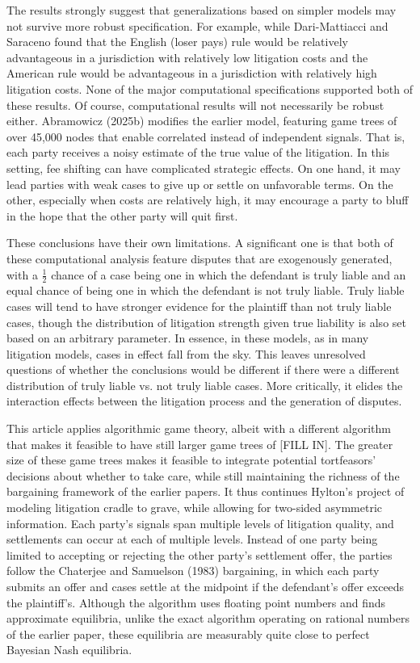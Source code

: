 \documentclass{article}
\begin{document}
The results strongly suggest that generalizations based on simpler models may not survive more robust specification. For example, while Dari-Mattiacci and Saraceno found that the English (loser pays) rule would be relatively advantageous in a jurisdiction with relatively low litigation costs and the American rule would be advantageous in a jurisdiction with relatively high litigation costs. None of the major computational specifications supported both of these results. Of course, computational results will not necessarily be robust either. Abramowicz (2025b) modifies the earlier model, featuring game trees of over 45,000 nodes that enable correlated instead of independent signals. That is, each party receives a noisy estimate of the true value of the litigation. In this setting, fee shifting can have complicated strategic effects. On one hand, it may lead parties with weak cases to give up or settle on unfavorable terms. On the other, especially when costs are relatively high, it may encourage a party to bluff in the hope that the other party will quit first. 

These conclusions have their own limitations. A significant one is that both of these computational analysis feature disputes that are exogenously generated, with a $\frac{1}{2}$ chance of a case being one in which the defendant is truly liable and an equal chance of being one in which the defendant is not truly liable. Truly liable cases will tend to have stronger evidence for the plaintiff than not truly liable cases, though the distribution of litigation strength given true liability is also set based on an arbitrary parameter. In essence, in these models, as in many litigation models, cases in effect fall from the sky. This leaves unresolved questions of whether the conclusions would be different if there were a different distribution of truly liable vs. not truly liable cases. More critically, it elides the interaction effects between the litigation process and the generation of disputes. 

This article applies algorithmic game theory, albeit with a different algorithm that makes it feasible to have still larger game trees of [FILL IN]. The greater size of these game trees makes it feasible to integrate potential tortfeasors' decisions about whether to take care, while still maintaining the richness of the bargaining framework of the earlier papers. It thus continues Hylton's project of modeling litigation cradle to grave, while allowing for two-sided asymmetric information. Each party's signals span multiple levels of litigation quality, and settlements can occur at each of multiple levels. Instead of one party being limited to accepting or rejecting the other party's settlement offer, the parties follow the Chaterjee and Samuelson (1983) bargaining, in which each party submits an offer and cases settle at the midpoint if the defendant's offer exceeds the plaintiff's. Although the algorithm uses floating point numbers and finds approximate equilibria, unlike the exact algorithm operating on rational numbers of the earlier paper, these equilibria are measurably quite close to perfect Bayesian Nash equilibria. 
\end{document}
